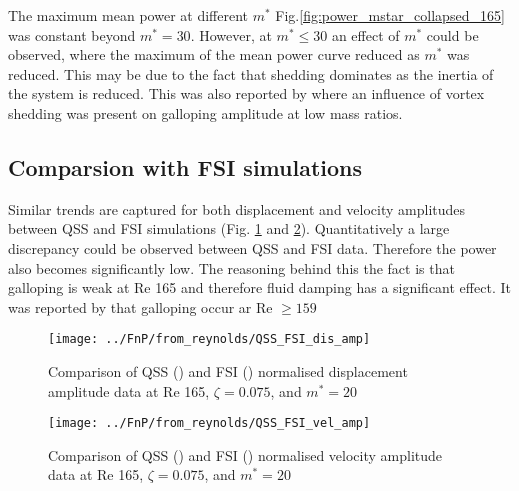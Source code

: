 The maximum mean power at different  $m^*$ Fig.\ref{fig:power_mstar_collapsed_165} was constant beyond $m^*=30$. However, at $m^* \leq 30$ an effect of $m^*$ could be observed, where the maximum of the mean power curve reduced as $m^*$ was reduced. This may be due to the fact that shedding dominates as the inertia of the system is reduced. This was also reported by \cite{Joly2012} where an influence of vortex shedding was present on galloping amplitude at low mass ratios. 


\subsection{Comparsion with FSI simulations}
 Similar trends are captured for both displacement and velocity amplitudes between QSS and FSI simulations (Fig. \ref{fig:QSS_FSI_dis_amp} and \ref{fig:QSS_FSI_vel_amp}). Quantitatively a large discrepancy  could be observed between QSS and FSI data. Therefore the power also becomes significantly low. The reasoning behind this the fact is that galloping is weak at Re 165 and therefore fluid damping has a significant effect. It was reported by \cite{Barrero-Gil2009} that galloping occur ar Re $\geq 159$
 
\begin{figure}[h!]
\centering
\texttt{[image: ../FnP/from\_reynolds/QSS\_FSI\_dis\_amp]}
\caption{Comparison of QSS ()  and FSI ()  normalised displacement amplitude data at Re 165, $\zeta=0.075$, and $m^*=20$}
\label{fig:QSS_FSI_dis_amp}
\end{figure}

\begin{figure}[h]
\centering
\texttt{[image: ../FnP/from\_reynolds/QSS\_FSI\_vel\_amp]}
\caption{Comparison of QSS ()  and FSI ()  normalised velocity amplitude data at Re 165, $\zeta=0.075$, and $m^*=20$}
\label{fig:QSS_FSI_vel_amp}
\end{figure}










 

 
 
 

 
 



 
 
 
 
 
 
 
 
 
 
  
 
 